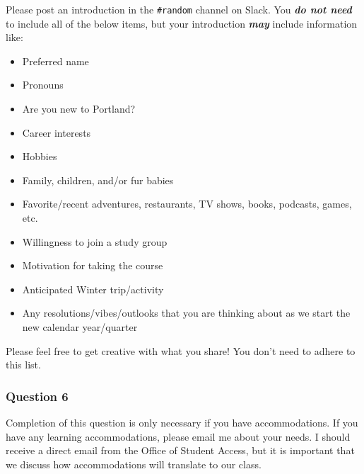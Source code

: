 \documentclass[
  letterpaper,
  DIV=11,
  numbers=noendperiod]{scrartcl}
\providecommand{\tightlist}{%
  \setlength{\itemsep}{0pt}\setlength{\parskip}{0pt}}\usepackage{longtable,booktabs,array}
\begin{document}
Please post an introduction in the \texttt{\#random} channel on Slack.
You \textbf{\emph{do not need}} to include all of the below items, but
your introduction \textbf{\emph{may}} include information like:

\begin{itemize}
\tightlist
\item
  Preferred name
\item
  Pronouns
\item
  Are you new to Portland?
\item
  Career interests
\item
  Hobbies
\item
  Family, children, and/or fur babies
\item
  Favorite/recent adventures, restaurants, TV shows, books, podcasts,
  games, etc.
\item
  Willingness to join a study group
\item
  Motivation for taking the course
\item
  Anticipated Winter trip/activity
\item
  Any resolutions/vibes/outlooks that you are thinking about as we start
  the new calendar year/quarter
\end{itemize}

Please feel free to get creative with what you share! You don't need to
adhere to this list.

\hypertarget{question-6}{%
\subsubsection{Question 6}\label{question-6}}

Completion of this question is only necessary if you have
accommodations. If you have any learning accommodations, please email me
about your needs. I should receive a direct email from the Office of
Student Access, but it is important that we discuss how accommodations
will translate to our class.
\end{document}
